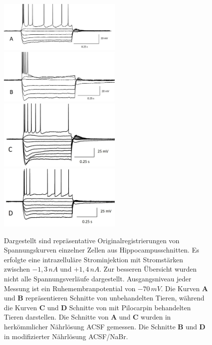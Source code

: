 \documentclass[a4paper,11pt]{report}
\begin{document}
{\begin{figure} [H]
\begin{center}
\includegraphics[width=6cm]{Abbildungen/membraneigenschaften/membraneigenschaften_k_c}
\includegraphics[width=6cm]{Abbildungen/membraneigenschaften/membraneigenschaften_k_br}
\includegraphics[width=6cm]{Abbildungen/membraneigenschaften/membraneigenschaften_p_c}
\includegraphics[width=6cm]{Abbildungen/membraneigenschaften/membraneigenschaften_p_br}

\caption{Dargestellt sind repräsentative Originalregistrierungen von Spannungskurven einzelner Zellen aus Hippocampusschnitten. Es erfolgte eine intrazelluläre Strominjektion mit Stromstärken zwischen $-1,3$\,$nA$ und $+1,4$\,$nA$. Zur besseren Übersicht wurden nicht alle Spannungsverläufe dargestellt. Ausgangsniveau jeder Messung ist ein Ruhemembranpotential von $-70\,mV$. Die Kurven \textbf{A} und \textbf{B} repräsentieren Schnitte von unbehandelten Tieren, während die Kurven \textbf{C} und \textbf{D} Schnitte von mit Pilocarpin behandelten Tieren darstellen. Die Schnitte von \textbf{A} und \textbf{C} wurden in herkömmlicher Nährlösung ACSF gemessen. Die Schnitte \textbf{B} und \textbf{D} in modifizierter Nährlösung ACSF/NaBr.}
\end{center}
\end{figure}



}
\end{document}
